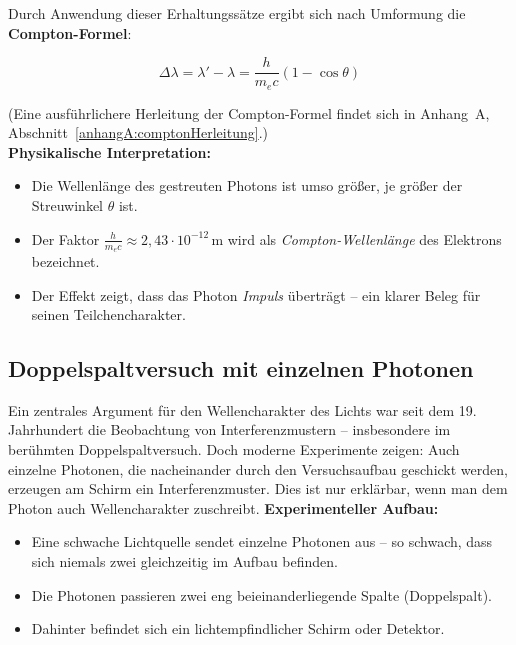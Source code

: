 Durch Anwendung dieser Erhaltungssätze ergibt sich nach Umformung die \textbf{Compton-Formel}:

\vspace{1em}
\begin{tcolorbox}[mathebox, title=Compton-Formel]
	\label{box:comptonFormel}
	\small
	\[
	\Delta \lambda = \lambda' - \lambda = \frac{h}{m_e c}(1 - \cos \theta)
	\]
\end{tcolorbox}
\vspace{1em}
(Eine ausführlichere Herleitung der Compton-Formel findet sich in Anhang~A, Abschnitt~\ref{anhangA:comptonHerleitung}.)\\ 

\textbf{Physikalische Interpretation:}
\begin{itemize}
	\item Die Wellenlänge des gestreuten Photons ist umso größer, je größer der Streuwinkel \( \theta \) ist.
	\item Der Faktor \( \frac{h}{m_e c} \approx 2{,}43 \cdot 10^{-12}\,\mathrm{m} \) wird als \emph{Compton-Wellenlänge} des Elektrons bezeichnet.
	\item Der Effekt zeigt, dass das Photon \emph{Impuls} überträgt – ein klarer Beleg für seinen Teilchencharakter.
\end{itemize}

\vspace{1em}

\subsection{Doppelspaltversuch mit einzelnen Photonen}

Ein zentrales Argument für den Wellencharakter des Lichts war seit dem 19. Jahrhundert die Beobachtung von Interferenzmustern – insbesondere im berühmten Doppelspaltversuch. Doch moderne Experimente zeigen: Auch einzelne Photonen, die nacheinander durch den Versuchsaufbau geschickt werden, erzeugen am Schirm ein Interferenzmuster. Dies ist nur erklärbar, wenn man dem Photon auch Wellencharakter zuschreibt.
\newpage
\noindent
\textbf{Experimenteller Aufbau:}
\begin{itemize}
	\item Eine schwache Lichtquelle sendet einzelne Photonen aus – so schwach, dass sich niemals zwei gleichzeitig im Aufbau befinden.
	\item Die Photonen passieren zwei eng beieinanderliegende Spalte (Doppelspalt).
	\item Dahinter befindet sich ein lichtempfindlicher Schirm oder Detektor.
\end{itemize}

